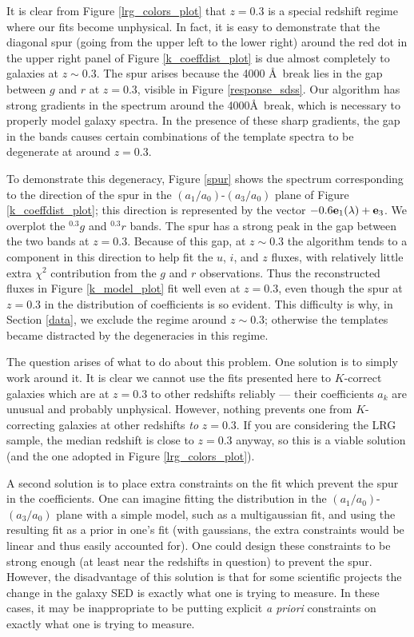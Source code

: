 \documentclass[10pt,preprint]{aastex}
\newcommand{\vv}[1]{{\bf #1}}
\newcommand{\band}[2]{\ensuremath{^{#1}{#2}}}
\begin{document}
It is clear from Figure \ref{lrg_colors_plot} that $z=0.3$ is a
special redshift regime where our fits become unphysical. In fact, it
is easy to demonstrate that the diagonal spur (going from the upper
left to the lower right) around the red dot in the upper right panel
of Figure \ref{k_coeffdist_plot} is due almost completely to galaxies
at $z\sim 0.3$. The spur arises because the 4000 \AA\ break lies in
the gap between $g$ and $r$ at $z=0.3$, visible in Figure
\ref{response_sdss}. Our algorithm has strong gradients in the
spectrum around the 4000\AA\ break, which is necessary to properly
model galaxy spectra. In the presence of these sharp gradients, the
gap in the bands causes certain combinations of the template spectra
to be degenerate at around $z=0.3$.

To demonstrate this degeneracy, Figure \ref{spur} shows the spectrum
corresponding to the direction of the spur in the
$(a_1/a_0)$-$(a_3/a_0)$ plane of Figure \ref{k_coeffdist_plot}; this
direction is represented by the vector $-0.6 \vv{e}_1(\lambda) +
\vv{e}_3$. We overplot the \band{0.3}{g} and \band{0.3}{r} bands. The
spur has a strong peak in the gap between the two bands at
$z=0.3$. Because of this gap, at $z\sim 0.3$ the algorithm tends to a
component in this direction to help fit the $u$, $i$, and $z$ fluxes,
with relatively little extra $\chi^2$ contribution from the $g$ and
$r$ observations. Thus the reconstructed fluxes in Figure
\ref{k_model_plot} fit well even at $z=0.3$, even though the spur at
$z=0.3$ in the distribution of coefficients is so evident.  This
difficulty is why, in Section \ref{data}, we exclude the regime around
$z\sim 0.3$; otherwise the templates became distracted by the
degeneracies in this regime.

The question arises of what to do about this problem. One solution is
to simply work around it. It is clear we cannot use the fits presented
here to $K$-correct galaxies which are at $z=0.3$ to other redshifts
reliably --- their coefficients $a_k$ are unusual and probably
unphysical. However, nothing prevents one from $K$-correcting galaxies
at other redshifts {\it to} $z=0.3$. If you are considering the LRG
sample, the median redshift is close to $z=0.3$ anyway, so this is a
viable solution (and the one adopted in Figure \ref{lrg_colors_plot}).

A second solution is to place extra constraints on the fit which
prevent the spur in the coefficients. One can imagine fitting the
distribution in the $(a_1/a_0)$-$(a_3/a_0)$ plane with a simple model,
such as a multigaussian fit, and using the resulting fit as a prior in
one's fit (with gaussians, the extra constraints would be linear and
thus easily accounted for). One could design these constraints to be
strong enough (at least near the redshifts in question) to prevent the
spur. However, the disadvantage of this solution is that for some
scientific projects the change in the galaxy SED is exactly what one
is trying to measure. In these cases, it may be inappropriate to be
putting explicit {\it a priori} constraints on exactly what one is
trying to measure.
\end{document}
